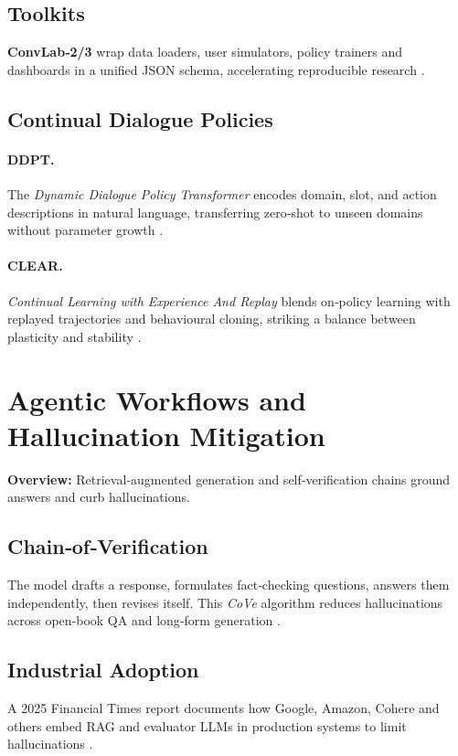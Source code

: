 \documentclass[11pt]{article}
\begin{document}
\subsection{Toolkits}
\textbf{ConvLab‑2/3} wrap data loaders, user simulators, policy trainers and dashboards in a unified JSON schema, accelerating reproducible research \citep{zhu2020convlab2, zhu2022convlab3}.

\subsection{Continual Dialogue Policies}
\paragraph{DDPT.}  The \emph{Dynamic Dialogue Policy Transformer} encodes domain, slot, and action descriptions in natural language, transferring zero‑shot to unseen domains without parameter growth \citep{geishauser2022ddpt}.  
\paragraph{CLEAR.}  \emph{Continual Learning with Experience And Replay} blends on‑policy learning with replayed trajectories and behavioural cloning, striking a balance between plasticity and stability \citep{rolnick2019clear}.

\section{Agentic Workflows and Hallucination Mitigation}
\textbf{Overview:}  Retrieval‑augmented generation and self‑verification chains ground answers and curb hallucinations.

\subsection{Chain‑of‑Verification}
The model drafts a response, formulates fact‑checking questions, answers them independently, then revises itself.  This \emph{CoVe} algorithm reduces hallucinations across open‑book QA and long‑form generation \citep{dhuliawala2023cove}.

\subsection{Industrial Adoption}
A 2025 Financial Times report documents how Google, Amazon, Cohere and others embed RAG and evaluator LLMs in production systems to limit hallucinations \citep{ft2025hallucinations}.
\end{document}
